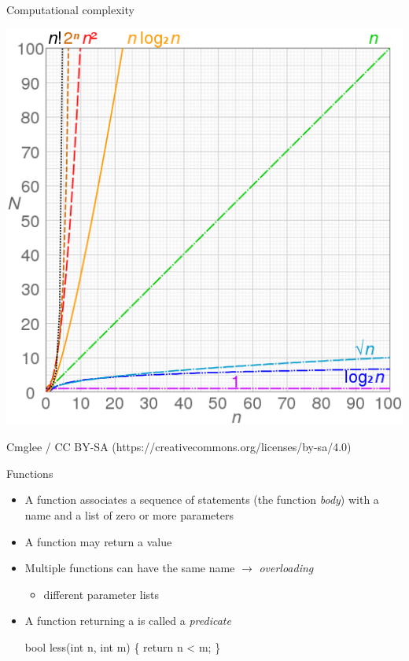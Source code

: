 \begin{frame}{Computational complexity \insertcontinuationtext}
  \begin{center}
    \includegraphics[height=.8\textheight]{images/O}
    \par
    \tiny{Cmglee / CC BY-SA (https://creativecommons.org/licenses/by-sa/4.0)}
  \end{center}
\end{frame}

\begin{frame}[fragile]{Functions}

  \begin{itemize}
  \item A function associates a sequence of statements (the function
    \textit{body}) with a name and a list of zero or more parameters

  \item A function may return a value
  \item Multiple functions can have the same name $\rightarrow$
    \textit{overloading}
    \begin{itemize}
    \item different parameter lists
    \end{itemize}

  \item<2-> A function returning a  is called a \textit{predicate}
    \begin{codeblock}
bool less(int n, int m) \{ return n < m; \}\end{codeblock}

  \end{itemize}

\end{frame}

